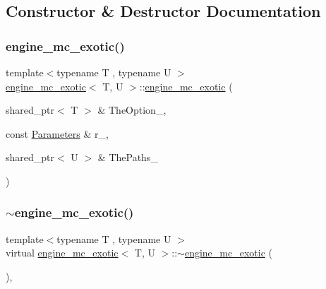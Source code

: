 \subsection{Constructor \& Destructor Documentation}
\hypertarget{classengine__mc__exotic_ac84b055a4f57a3e08d5a0a0093167b53}{}\label{classengine__mc__exotic_ac84b055a4f57a3e08d5a0a0093167b53} 
\subsubsection{\texorpdfstring{engine\+\_\+mc\+\_\+exotic()}{engine\_mc\_exotic()}}
{\footnotesize\ttfamily template$<$typename T , typename U $>$ \\
\hyperlink{classengine__mc__exotic}{engine\+\_\+mc\+\_\+exotic}$<$ T, U $>$\+::\hyperlink{classengine__mc__exotic}{engine\+\_\+mc\+\_\+exotic} (\begin{DoxyParamCaption}\item[{shared\+\_\+ptr$<$ T $>$ \&}]{The\+Option\+\_\+,  }\item[{const \hyperlink{classParameters}{Parameters} \&}]{r\+\_\+,  }\item[{shared\+\_\+ptr$<$ U $>$ \&}]{The\+Paths\+\_\+ }\end{DoxyParamCaption})\hspace{0.3cm}{\ttfamily [inline]}}

\hypertarget{classengine__mc__exotic_ab36a687185223f73a36bfe2f1ba6f75d}{}\label{classengine__mc__exotic_ab36a687185223f73a36bfe2f1ba6f75d} 
\subsubsection{\texorpdfstring{$\sim$engine\+\_\+mc\+\_\+exotic()}{~engine\_mc\_exotic()}}
{\footnotesize\ttfamily template$<$typename T , typename U $>$ \\
virtual \hyperlink{classengine__mc__exotic}{engine\+\_\+mc\+\_\+exotic}$<$ T, U $>$\+::$\sim$\hyperlink{classengine__mc__exotic}{engine\+\_\+mc\+\_\+exotic} (\begin{DoxyParamCaption}{ }\end{DoxyParamCaption})\hspace{0.3cm}{\ttfamily [inline]}, {\ttfamily [virtual]}}



